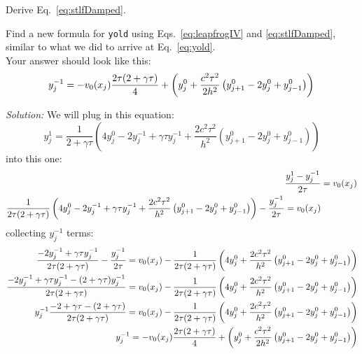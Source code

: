 \begin{enumerate}
\probtwo \label{P:14.1}
\begin{enumerate}

\subprob Derive Eq.~\eqref{eq:stlfDamped}.

\subprob Find a new formula for {\tt yold} using
Eqs.~\eqref{eq:leapfrogIV} and \eqref{eq:stlfDamped}, similar to what
we did to arrive at Eq.~\eqref{eq:yold}.\\
 Your answer should look like
    this:
\begin{equation}
  y_j^{-1} = -v_0(x_j) \frac{2 \tau(2+\gamma
    \tau) }{4 } + \left ( y_j^0 + \frac{c^2 \tau^2}{2h^2} \left( y_{j+1}^0 - 2 y_j^0 +
      y_{j-1}^0
    \right) \right) \\
\end{equation}

\ifsolutions
\textit{Solution:}
We will plug in this equation:
\begin{equation}
y_j^1 = \frac{1}{2+\gamma \tau} \left (
    4 y_j^0 - 2y_j^{-1} + \gamma \tau y_j^{-1}
    + \frac{2 c^2 \tau^2}{h^2} \left( y_{j+1}^0 - 2 y_j^0 + y_{j-1}^0
    \right) \right)
\end{equation}
into this one:
\begin{align}
    {y_j^1-y_j^{-1} \over 2 \tau} &= v_0(x_j)\\
\frac{1}{2 \tau(2+\gamma \tau)} \left (
    4 y_j^0 - 2y_j^{-1} + \gamma \tau y_j^{-1}
    + \frac{2 c^2 \tau^2}{h^2} \left( y_{j+1}^0 - 2 y_j^0 + y_{j-1}^0
    \right) \right) - {y_j^{-1} \over 2 \tau} = v_0(x_j)\\
\end{align}
collecting $y_j^{-1}$ terms:
\begin{align}
  \frac{-2 y_j^{-1} + \gamma \tau y_j^{-1}}{2 \tau(2+\gamma \tau)} -
  {y_j^{-1} \over 2 \tau} = v_0(x_j) - \frac{1}{2 \tau(2+\gamma \tau)}
  \left ( 4 y_j^0 + \frac{2 c^2 \tau^2}{h^2} \left( y_{j+1}^0 - 2
      y_j^0 + y_{j-1}^0
    \right) \right) \\
  \frac{-2 y_j^{-1} + \gamma \tau y_j^{-1} - (2 + \gamma \tau)
    y_j^{-1}}{2 \tau(2+\gamma \tau)} = v_0(x_j) - \frac{1}{2
    \tau(2+\gamma \tau)} \left ( 4 y_j^0 + \frac{2 c^2 \tau^2}{h^2}
    \left( y_{j+1}^0 - 2 y_j^0 + y_{j-1}^0
    \right) \right) \\
  y_j^{-1}\frac{-2 + \gamma \tau - (2 + \gamma \tau) }{2 \tau(2+\gamma
    \tau)} = v_0(x_j) - \frac{1}{2 \tau(2+\gamma \tau)} \left ( 4
    y_j^0 + \frac{2 c^2 \tau^2}{h^2} \left( y_{j+1}^0 - 2 y_j^0 +
      y_{j-1}^0
    \right) \right) \\
  y_j^{-1} = -v_0(x_j) \frac{2 \tau(2+\gamma
    \tau) }{4 } + \left ( y_j^0 + \frac{c^2 \tau^2}{2h^2} \left( y_{j+1}^0 - 2 y_j^0 +
      y_{j-1}^0
    \right) \right) \\
\end{align}


\end{enumerate}
\end{enumerate}
